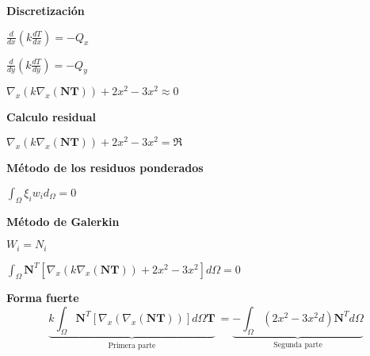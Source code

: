 \documentclass[12pt]{report}
\begin{document}
    \textbf{Discretización}

    \begin{center}
        $\displaystyle \frac{d}{dx} \left( k \frac{dT}{dx} \right) = -Q_x$

        $\displaystyle \frac{d}{dy} \left( k \frac{dT}{dy} \right) = -Q_y$

        $\displaystyle \nabla_x (k \nabla_x (\bm{NT})) + 2x^2 -3x^2 \approx 0$
    \end{center}

    \textbf{Calculo residual}

    \begin{center}
        $\displaystyle \nabla_x (k \nabla_x (\bm{NT})) + 2x^2 -3x^2 = \Re$
    \end{center}

    \newpage
    \textbf{Método de los residuos ponderados}

    \begin{center}
        $\displaystyle \int_\Omega \xi_i w_i d_\Omega = 0$
    \end{center}

    \textbf{Método de Galerkin}

    \begin{center}
        $\displaystyle W_i = N_i$

        $\displaystyle \int_\Omega \bm N^T \left[\nabla_x (k \nabla_x (\bm{NT}))+2x^2 -3x^2\right]d\Omega = 0$
    \end{center}

    \begin{center}
        \textbf{Forma fuerte}
        \[
        \displaystyle 
        \underbrace{k\int_\Omega \bm N^T \left[\nabla_x (\nabla_x (\bm{NT}))\right]d\Omega \bm T}_{\text{Primera parte}} 
        \ = 
        \underbrace{- \int_\Omega (2x^2 -3x^2d) \bm N^T d\Omega}_{\text{Segunda parte}}
        \]
    \end{center}
\end{document}
